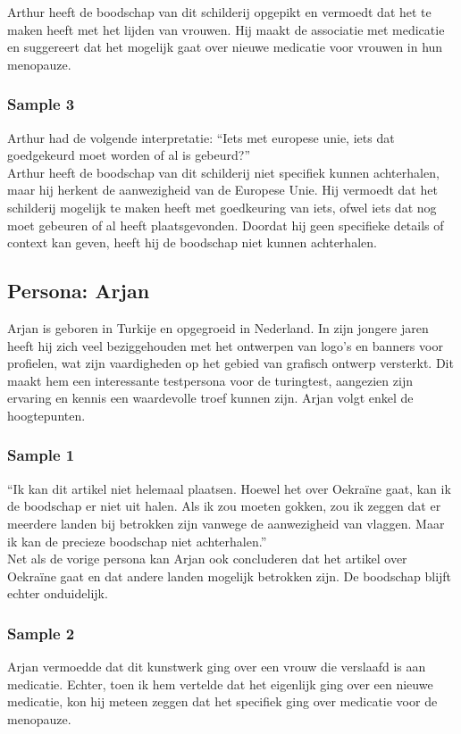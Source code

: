  Arthur heeft de boodschap van dit schilderij opgepikt en vermoedt dat het te maken heeft met het lijden van vrouwen. Hij maakt de associatie met medicatie en suggereert dat het mogelijk gaat over nieuwe medicatie voor vrouwen in hun menopauze. 
 
 \subsubsection{Sample 3}
Arthur had de volgende interpretatie: ``Iets met europese unie, iets dat goedgekeurd moet worden of al is gebeurd?'' \\

Arthur heeft de boodschap van dit schilderij niet specifiek kunnen achterhalen, maar hij herkent de aanwezigheid van de Europese Unie. Hij vermoedt dat het schilderij mogelijk te maken heeft met goedkeuring van iets, ofwel iets dat nog moet gebeuren of al heeft plaatsgevonden. Doordat hij geen specifieke details of context kan geven, heeft hij de boodschap niet kunnen achterhalen. 


\subsection{Persona: Arjan}
Arjan is geboren in Turkije en opgegroeid in Nederland. In zijn jongere jaren heeft hij zich veel beziggehouden met het ontwerpen van logo's en banners voor profielen, wat zijn vaardigheden op het gebied van grafisch ontwerp versterkt. Dit maakt hem een interessante testpersona voor de turingtest, aangezien zijn ervaring en kennis een waardevolle troef kunnen zijn. Arjan volgt enkel de hoogtepunten.
 \subsubsection{Sample 1}
``Ik kan dit artikel niet helemaal plaatsen. Hoewel het over Oekraïne gaat, kan ik de boodschap er niet uit halen. Als ik zou moeten gokken, zou ik zeggen dat er meerdere landen bij betrokken zijn vanwege de aanwezigheid van vlaggen. Maar ik kan de precieze boodschap niet achterhalen.'' \\

Net als de vorige persona kan Arjan ook concluderen dat het artikel over Oekraïne gaat en dat andere landen mogelijk betrokken zijn. De boodschap blijft echter onduidelijk.

\subsubsection{Sample 2}
Arjan vermoedde dat dit kunstwerk ging over een vrouw die verslaafd is aan medicatie. Echter, toen ik hem vertelde dat het eigenlijk ging over een nieuwe medicatie, kon hij meteen zeggen dat het specifiek ging over medicatie voor de menopauze. \\

